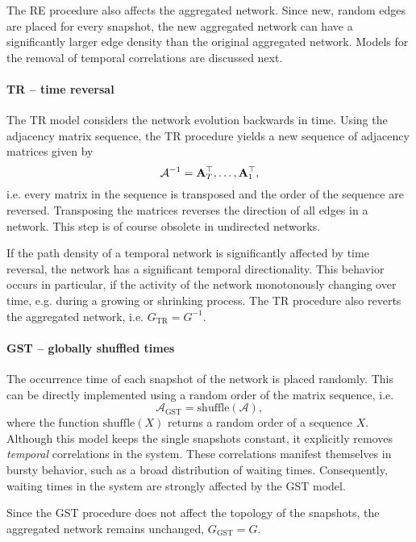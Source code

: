 The RE procedure also affects the aggregated network.
Since new, random edges are placed for every snapshot, the new aggregated network can have a significantly larger edge density than the original aggregated network.
Models for the removal of temporal correlations are discussed next.

\paragraph{TR -- time reversal\color{Cayenne}{.}}
The TR model considers the network evolution backwards in time.
Using the adjacency matrix sequence, the TR procedure yields a new sequence of adjacency matrices given by
\begin{equation}\label{eq:TR_secuence}
\mathcal{A}^{-1}=\mathbf{A}^\top _T, \dots ,\mathbf{A}_1 ^\top,
\end{equation}
i.e. every matrix in the sequence is transposed and the order of the sequence are reversed.
Transposing the matrices reverses the direction of all edges in a network.
This step is of course obsolete in undirected networks.

If the path density of a temporal network is significantly affected by time reversal, the network has a significant temporal directionality.
This behavior occurs in particular, if the activity of the network monotonously changing over time, e.g. during a growing or shrinking process.
The TR procedure also reverts the aggregated network, i.e. $G_{\mathrm{TR}}=G^{-1}$.

\paragraph{GST -- globally shuffled times\color{Cayenne}{.}}
The occurrence time of each snapshot of the network is placed randomly.
This can be directly implemented using a random order of the matrix sequence, i.e.
\begin{equation}\label{eq:GST_sequence}
\mathcal{A}_\mathrm{GST}=\mathrm{shuffle}(\mathcal{A}) ,
\end{equation}
where the function $\mathrm{shuffle}(X)$ returns a random order of a sequence $X$.
Although this model keeps the single snapshots constant, it explicitly removes \emph{temporal} correlations in the system.
These correlations manifest themselves in bursty behavior, such as a broad distribution of waiting times.
Consequently, waiting times in the system are strongly affected by the GST model.

Since the GST procedure does not affect the topology of the snapshots, the aggregated network remains unchanged, $G_\mathrm{GST}=G$.

